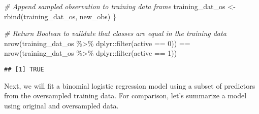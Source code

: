 \documentclass[
]{book}
\newenvironment{Shaded}{\begin{snugshade}}{\end{snugshade}}
\newcommand{\CommentTok}[1]{\textcolor[rgb]{0.56,0.35,0.01}{\textit{#1}}}
\newcommand{\DecValTok}[1]{\textcolor[rgb]{0.00,0.00,0.81}{#1}}
\newcommand{\FunctionTok}[1]{\textcolor[rgb]{0.00,0.00,0.00}{#1}}
\newcommand{\NormalTok}[1]{#1}
\newcommand{\OtherTok}[1]{\textcolor[rgb]{0.56,0.35,0.01}{#1}}
\newcommand{\SpecialCharTok}[1]{\textcolor[rgb]{0.00,0.00,0.00}{#1}}
\begin{document}
\begin{Shaded}
\begin{Highlighting}[]
  \CommentTok{\# Append sampled observation to training data frame}
\NormalTok{  training\_dat\_os }\OtherTok{\textless{}{-}} \FunctionTok{rbind}\NormalTok{(training\_dat\_os, new\_obs)}
\NormalTok{\}}

\CommentTok{\# Return Boolean to validate that classes are equal in the training data}
\FunctionTok{nrow}\NormalTok{(training\_dat\_os }\SpecialCharTok{\%\textgreater{}\%}\NormalTok{ dplyr}\SpecialCharTok{::}\FunctionTok{filter}\NormalTok{(active }\SpecialCharTok{==} \DecValTok{0}\NormalTok{)) }\SpecialCharTok{==} \FunctionTok{nrow}\NormalTok{(training\_dat\_os }\SpecialCharTok{\%\textgreater{}\%}\NormalTok{ dplyr}\SpecialCharTok{::}\FunctionTok{filter}\NormalTok{(active }\SpecialCharTok{==} \DecValTok{1}\NormalTok{))}
\end{Highlighting}
\end{Shaded}

\begin{verbatim}
## [1] TRUE
\end{verbatim}

Next, we will fit a binomial logistic regression model using a subset of predictors from the oversampled training data. For comparison, let's summarize a model using original and oversampled data.

\providecommand{\docline}[3]{\noalign{\global\setlength{\arrayrulewidth}{#1}}\arrayrulecolor[HTML]{#2}\cline{#3}}

\setlength{\tabcolsep}{2pt}

\renewcommand*{\arraystretch}{1.5}
\end{document}
